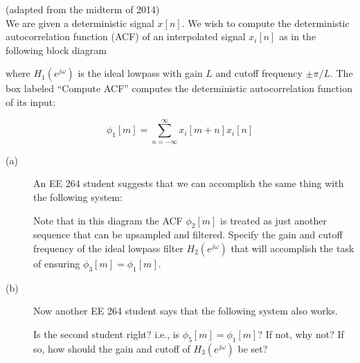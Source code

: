 \documentclass[12pt]{report}
\begin{document}
\newpage
{} (adapted from the midterm of 2014)\\

We are given a deterministic signal $x[n]$. We wish to compute the deterministic autocorrelation function (ACF) of an interpolated signal $x_i[n]$ as in the following block diagram

\begin{figure}[h!]
	\centering
	\def\sysstate{1}
	\resizebox{0.7\textwidth}{!}{}
\end{figure}
\noindent where $H_1(e^{j\omega})$ is the ideal lowpass with gain $L$ and cutoff frequency $\pm\pi/L$. The box labeled ``Compute ACF'' computes the deterministic autocorrelation function of its input:

\begin{equation}
\phi_1[m] = \sum_{n=-\infty}^{\infty} x_i[m+n]x_i[n] \tag{Assume that this inifite sum exists}
\end{equation}

\begin{description}
	\item[(a)] An EE 264 student suggests that we can accomplish the same thing with the following system:
	\begin{figure}[h!]
		\centering
		\let\sysstate\undefined
		\def\sysa{1}
		\resizebox{0.7\textwidth}{!}{}
	\end{figure}

	Note that in this diagram the ACF $\phi_2[m]$ is treated as just another sequence that can be upsampled and filtered. Specify the gain and cutoff frequency of the ideal lowpass filter $H_2(e^{j\omega})$ that will accomplish the task of ensuring $\phi_3[m] = \phi_1[m]$.
	
	\item[(b)] Now another EE 264 student says that the following system also works.
		\begin{figure}[h!]
		\centering
		\let\sysa\undefined
		\def\sysb{1}
		\resizebox{0.7\textwidth}{!}{}
		\end{figure}
	
	Is the second student right? i.e., is $\phi_5[m] = \phi_1[m]$? If not, why not? If so, how should the gain and cutoff of $H_3(e^{j\omega})$ be set?
		
\end{description}


\newpage 
\end{document}
